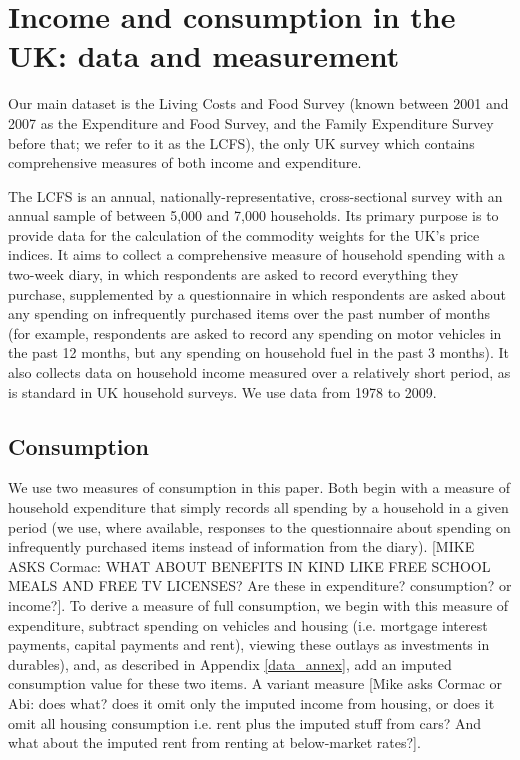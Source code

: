 \section{Income and consumption in the UK: data and measurement}\label{sec:measure}

Our main dataset is the Living Costs and Food Survey (known between 2001 and 2007 as the Expenditure and Food Survey, and the Family Expenditure Survey before that; we refer to it as the LCFS), the only UK survey which contains comprehensive measures of both income and expenditure.

The LCFS is an annual, nationally-representative, cross-sectional survey with an annual sample of between 5,000 and 7,000 households. Its primary purpose is to provide data for the calculation of the commodity  weights for the UK's price indices. It aims to collect a comprehensive measure of household spending with a two-week diary, in which respondents are asked to record everything they  purchase, supplemented by a questionnaire in which respondents are asked about any spending on infrequently purchased items over the past number of months (for example, respondents are asked to record any spending on motor vehicles in the past 12 months, but any spending on household fuel in the past 3 months). It also collects data on household income measured over a relatively short period, as is standard in UK household surveys. We use data from 1978 to 2009.

\subsection{Consumption}
We use two measures of consumption in this paper. Both begin with a measure of household expenditure that simply records all spending by a household in a given period (we use, where available, responses to the questionnaire about spending on infrequently purchased items instead of information from the diary). [MIKE ASKS Cormac: WHAT ABOUT BENEFITS IN KIND LIKE FREE SCHOOL MEALS AND FREE TV LICENSES? Are these in expenditure? consumption? or income?]. To derive a measure of full consumption, we begin with this measure of expenditure, subtract spending on vehicles and housing (i.e. mortgage interest payments, capital payments and rent), viewing these outlays as investments in durables), and, as described in Appendix \ref{data_annex}, add an imputed consumption value for these two items.  A variant measure [Mike asks Cormac or Abi: does what? does it omit only the imputed income from housing, or does it omit all housing consumption i.e. rent plus the imputed stuff from cars? And what about the imputed rent from renting at below-market rates?].

